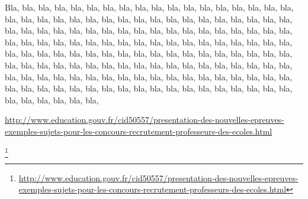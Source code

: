 \documentclass[french]{article}
\begin{document}
 

Bla, bla, bla, bla, bla, bla, bla, bla, bla, bla, bla, bla, bla, bla, bla,
bla, bla, bla, bla, bla, bla, bla, bla, bla, bla, bla, bla, bla, bla, bla,
bla, bla, bla, bla, bla, bla, bla, bla, bla, bla, bla, bla, bla, bla, bla,
bla, bla, bla, bla, bla, bla, bla, bla, bla, bla, bla, bla, bla, bla, bla,
bla, bla, bla, bla, bla, bla, bla, bla, bla, bla, bla, bla, bla, bla, bla,
bla, bla, bla, bla, bla, bla, bla, bla, bla, bla, bla, bla, bla, bla, bla,
bla, bla, bla, bla, bla, bla, bla, bla, bla, bla, bla, bla, bla, bla, bla,
bla, bla, bla, bla, bla, bla, bla, bla, bla, bla, bla, bla, bla, bla, bla,
bla, bla, bla, bla, bla, bla, bla, bla, bla, bla, bla, bla, bla, bla, bla,
bla, bla, bla, bla, bla, bla, bla, bla, bla, bla, bla, bla, bla, bla, bla,

\url{http://www.education.gouv.fr/cid50557/presentation-des-nouvelles-epreuves-exemples-sujets-pour-les-concours-recrutement-professeurs-des-ecoles.html}
 
\footnote{\url{http://www.education.gouv.fr/cid50557/presentation-des-nouvelles-epreuves-exemples-sujets-pour-les-concours-recrutement-professeurs-des-ecoles.html}}
\end{document}
